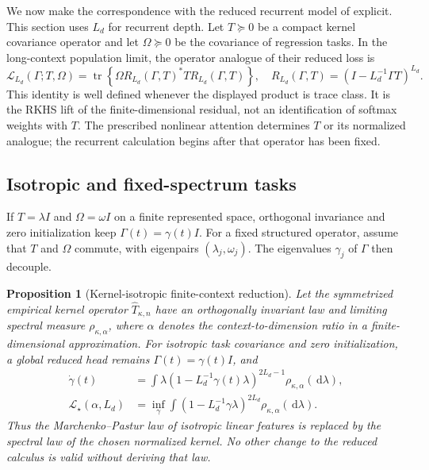 \documentclass[11pt,a4paper]{article}
\numberwithin{equation}{section}
\newtheorem{proposition}[theorem]{Proposition}
\theoremstyle{definition}
\theoremstyle{remark}
\newcommand{\loss}{\mathcal L}
\newcommand{\tr}{\operatorname{tr}}
\newcommand{\dd}{\,\mathrm d}
\begin{document}
We now make the correspondence with the reduced recurrent model of
\citet{bordelon2026scaling} explicit.  This section uses $L_d$ for recurrent
depth.  Let $T\succeq0$ be a compact kernel covariance operator and let
$\Omega\succeq0$ be the covariance of regression tasks.  In the long-context
population limit, the operator analogue of their reduced loss is
\begin{equation}
 \loss_{L_d}(\Gamma;T,\Omega)
 =\tr\!\left\{
 \Omega R_{L_d}(\Gamma,T)^*T R_{L_d}(\Gamma,T)
 \right\},
 \quad
 R_{L_d}(\Gamma,T)=
 \left(I-L_d^{-1}\Gamma T\right)^{L_d}.
 \label{eq:reduced-gamma-loss}
\end{equation}
This identity is well defined whenever the displayed product is trace class.
It is the RKHS lift of the finite-dimensional residual, not an identification
of softmax weights with $T$.  The prescribed nonlinear attention determines
$T$ or its normalized analogue; the recurrent calculation begins after that
operator has been fixed.

\subsection{Isotropic and fixed-spectrum tasks}

If $T=\lambda I$ and $\Omega=\omega I$ on a finite represented space,
orthogonal invariance and zero initialization keep $\Gamma(t)=\gamma(t)I$.
For a fixed structured operator, assume that $T$ and $\Omega$ commute, with
eigenpairs $(\lambda_j,\omega_j)$.  The eigenvalues $\gamma_j$ of $\Gamma$
then decouple.

\begin{proposition}[Kernel-isotropic finite-context reduction]
\label{prop:kernel-iso}
Let the symmetrized empirical kernel operator $\widehat T_{\kappa,n}$ have an
orthogonally invariant law and limiting spectral measure
$\rho_{\kappa,\alpha}$, where $\alpha$ denotes the context-to-dimension ratio
in a finite-dimensional approximation.  For isotropic task covariance and
zero initialization, a global reduced head remains $\Gamma(t)=\gamma(t)I$,
and
\begin{align}
 \dot\gamma(t)
 &=\int \lambda
 \left(1-L_d^{-1}\gamma(t)\lambda\right)^{2L_d-1}
 \rho_{\kappa,\alpha}(\dd\lambda),
 \label{eq:kernel-iso-flow}\\
 \loss_\star(\alpha,L_d)
 &=\inf_\gamma\int
 \left(1-L_d^{-1}\gamma\lambda\right)^{2L_d}
 \rho_{\kappa,\alpha}(\dd\lambda).
 \label{eq:kernel-iso-loss}
\end{align}
Thus the Marchenko--Pastur law of isotropic linear features is replaced by the
spectral law of the chosen normalized kernel.  No other change to the reduced
calculus is valid without deriving that law.
\end{proposition}
\end{document}
